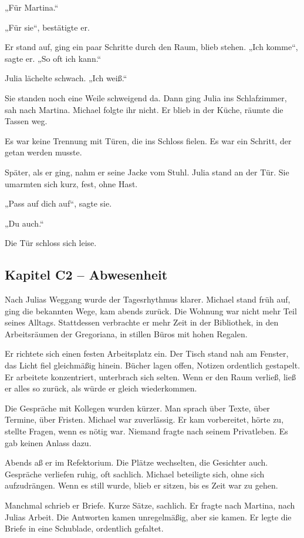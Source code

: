 \documentclass[
]{article}
\begin{document}
„Für Martina.``

„Für sie``, bestätigte er.

Er stand auf, ging ein paar Schritte durch den Raum, blieb stehen. „Ich komme``, sagte er. „So oft ich kann.``

Julia lächelte schwach. „Ich weiß.``

Sie standen noch eine Weile schweigend da. Dann ging Julia ins Schlafzimmer, sah nach Martina. Michael folgte ihr nicht. Er blieb in der Küche, räumte die Tassen weg.

Es war keine Trennung mit Türen, die ins Schloss fielen. Es war ein Schritt, der getan werden musste.

Später, als er ging, nahm er seine Jacke vom Stuhl. Julia stand an der Tür. Sie umarmten sich kurz, fest, ohne Hast.

„Pass auf dich auf``, sagte sie.

„Du auch.``

Die Tür schloss sich leise.

\subsection{Kapitel C2 -- Abwesenheit}\label{kapitel-c2-abwesenheit}

Nach Julias Weggang wurde der Tagesrhythmus klarer. Michael stand früh auf, ging die bekannten Wege, kam abends zurück. Die Wohnung war nicht mehr Teil seines Alltags. Stattdessen verbrachte er mehr Zeit in der Bibliothek, in den Arbeitsräumen der Gregoriana, in stillen Büros mit hohen Regalen.

Er richtete sich einen festen Arbeitsplatz ein. Der Tisch stand nah am Fenster, das Licht fiel gleichmäßig hinein. Bücher lagen offen, Notizen ordentlich gestapelt. Er arbeitete konzentriert, unterbrach sich selten. Wenn er den Raum verließ, ließ er alles so zurück, als würde er gleich wiederkommen.

Die Gespräche mit Kollegen wurden kürzer. Man sprach über Texte, über Termine, über Fristen. Michael war zuverlässig. Er kam vorbereitet, hörte zu, stellte Fragen, wenn es nötig war. Niemand fragte nach seinem Privatleben. Es gab keinen Anlass dazu.

Abends aß er im Refektorium. Die Plätze wechselten, die Gesichter auch. Gespräche verliefen ruhig, oft sachlich. Michael beteiligte sich, ohne sich aufzudrängen. Wenn es still wurde, blieb er sitzen, bis es Zeit war zu gehen.

Manchmal schrieb er Briefe. Kurze Sätze, sachlich. Er fragte nach Martina, nach Julias Arbeit. Die Antworten kamen unregelmäßig, aber sie kamen. Er legte die Briefe in eine Schublade, ordentlich gefaltet.
\end{document}
